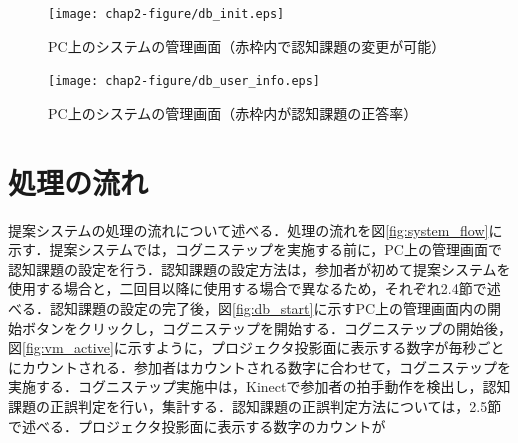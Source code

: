 \begin{figure}[tbp]
	\centering
			\texttt{[image: chap2-figure/db\_init.eps]}
	\caption{PC上のシステムの管理画面（赤枠内で認知課題の変更が可能）}
	\label{fig:system_management}
\end{figure}

\begin{figure}[tbp]
	\centering
			\texttt{[image: chap2-figure/db\_user\_info.eps]}
	\caption{PC上のシステムの管理画面（赤枠内が認知課題の正答率）}
	\label{fig:check_answer_rate}
\end{figure}


\section{処理の流れ}
提案システムの処理の流れについて述べる．処理の流れを図\ref{fig:system_flow}に示す．提案システムでは，コグニステップを実施する前に，PC上の管理画面で認知課題の設定を行う．認知課題の設定方法は，参加者が初めて提案システムを使用する場合と，二回目以降に使用する場合で異なるため，それぞれ2.4節で述べる．認知課題の設定の完了後，図\ref{fig:db_start}に示すPC上の管理画面内の開始ボタンをクリックし，コグニステップを開始する．コグニステップの開始後，図\ref{fig:vm_active}に示すように，プロジェクタ投影面に表示する数字が毎秒ごとにカウントされる．参加者はカウントされる数字に合わせて，コグニステップを実施する．コグニステップ実施中は，Kinectで参加者の拍手動作を検出し，認知課題の正誤判定を行い，集計する．認知課題の正誤判定方法については，2.5節で述べる．プロジェクタ投影面に表示する数字のカウントが

